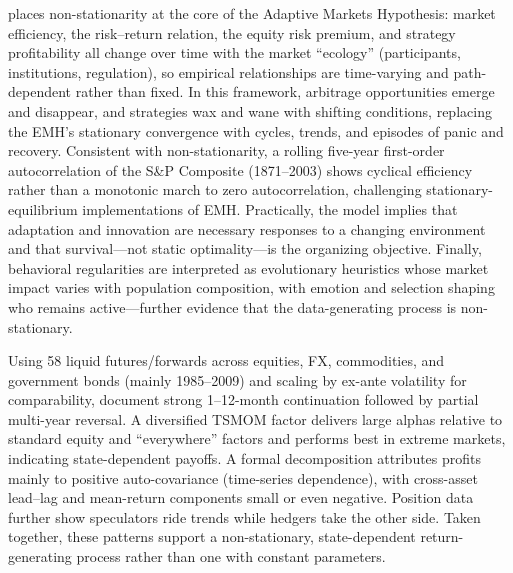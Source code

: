 \cite{Lo} places non-stationarity at the core of the Adaptive Markets Hypothesis: market efficiency, the risk–return relation, the equity risk premium, and strategy profitability all change over time with the market “ecology” (participants, institutions, regulation), so empirical relationships are time-varying and path-dependent rather than fixed. In this framework, arbitrage opportunities emerge and disappear, and strategies wax and wane with shifting conditions, replacing the EMH’s stationary convergence with cycles, trends, and episodes of panic and recovery. Consistent with non-stationarity, a rolling five-year first-order autocorrelation of the S\&P Composite (1871–2003) shows cyclical efficiency rather than a monotonic march to zero autocorrelation, challenging stationary-equilibrium implementations of EMH. Practically, the model implies that adaptation and innovation are necessary responses to a changing environment and that survival—not static optimality—is the organizing objective. Finally, behavioral regularities are interpreted as evolutionary heuristics whose market impact varies with population composition, with emotion and selection shaping who remains active—further evidence that the data-generating process is non-stationary.

Using 58 liquid futures/forwards across equities, FX, commodities, and government bonds (mainly 1985–2009) and scaling by ex-ante volatility for comparability, \cite{MOSKOWITZ2012228} document strong 1–12-month continuation followed by partial multi-year reversal. A diversified TSMOM factor delivers large alphas relative to standard equity and “everywhere” factors and performs best in extreme markets, indicating state-dependent payoffs. A formal decomposition attributes profits mainly to positive auto-covariance (time-series dependence), with cross-asset lead–lag and mean-return components small or even negative. Position data further show speculators ride trends while hedgers take the other side. Taken together, these patterns support a non-stationary, state-dependent return-generating process rather than one with constant parameters.


